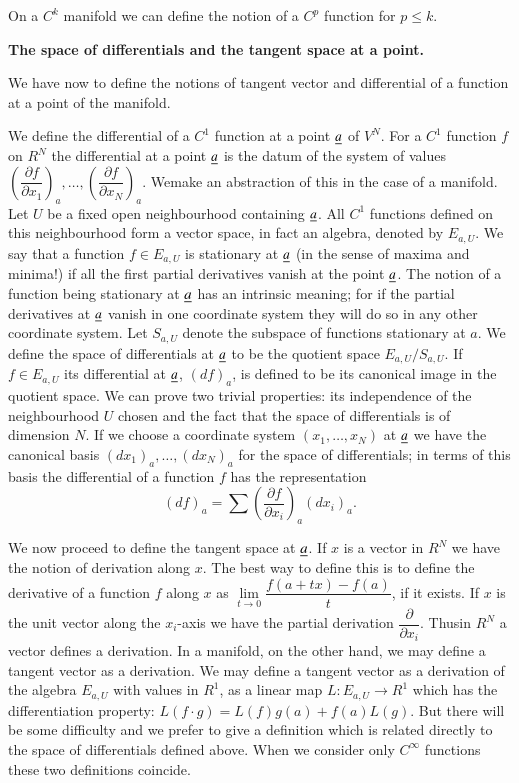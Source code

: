 On a $C^{k}$ manifold we can define the notion of a $C^{p}$ function
for $p\leq k$.

\noindent
{\bf The space of differentials and the tangent space at a point.}

We have now to define the notions of tangent vector and differential
of a function at a point of the manifold.

We define the differential of a $C^{1}$ function at a point $\underline{a}$
of $V^{N}$. For a $C^{1}$ function $f$ on $R^{N}$ the differential at
a point $\underline{a}$ is the datum of the system of values
$\left(\dfrac{\partial f}{\partial
  x_{1}}\right)_{a},\ldots,\left(\dfrac{\partial f}{\partial
  x_{N}}\right)_{a}$. We\pageoriginale make an abstraction of this in
the case of a manifold. Let $U$ be a fixed open neighbourhood
containing $\underline{a}$. All $C^{1}$ functions defined on this
neighbourhood form a vector space, in fact an algebra, denoted by
$E_{a,U}$. We say that a function $f\in E_{a,U}$ is stationary at
$\underline{a}$ (in the sense of maxima and minima!) if all the first partial
derivatives vanish at the point $\underline{a}$. The notion of a function
being stationary at $\underline{a}$ has an intrinsic meaning; for if the
partial derivatives at $\underline{a}$ vanish in one coordinate system they
will do so in any other coordinate system. Let $S_{a,U}$ denote the
subspace of functions stationary at $a$. We define the space of
differentials at $\underline{a}$ to be the quotient space
$E_{a,U}/S_{a,U}$. If $f\in E_{a,U}$ its differential at $\underline{a}$,
$(df)_{a}$, is defined to be its canonical image in the quotient
space. We can prove two trivial properties: its independence of the
neighbourhood $U$ chosen and the fact that the space of differentials
is of dimension $N$. If we choose a coordinate system
$(x_{1},\ldots,x_{N})$ at $\underline{a}$ we have the canonical basis
$(dx_{1})_{a},\ldots,(dx_{N})_{a}$ for the space of differentials; in
terms of this basis the differential of a function $f$ has the
representation
$$
(df)_{a}=\sum\left(\frac{\partial f}{\partial
  x_{i}}\right)_{a}(dx_{i})_{a}.
$$

We now proceed to define the tangent space at $\underline{a}$. If $x$ is a
vector in $R^{N}$ we have the notion of derivation along $x$. The best
way to define this is to define the derivative of a function $f$ along
$x$ as $\lim\limits_{t\to 0}\dfrac{f(a+tx)-f(a)}{t}$, if it exists. If
$x$ is the unit vector along the $x_{i}$-axis we have the partial
derivation $\dfrac{\partial}{\partial x_{i}}$. 
Thus\pageoriginale in $R^{N}$ a vector defines a derivation. In a
manifold, on the other hand, we may define a tangent vector as a
derivation. We may define a tangent vector as a derivation of the
algebra $E_{a,U}$ with values in $R^{1}$, \iec as a linear map
$L:E_{a,U}\to R^{1}$ which has the differentiation property: $L(f\cdot
g)=L(f)g(a)+f(a)L(g)$. But there will be some difficulty and we prefer
to give a definition which is related directly to the space of
differentials defined above. When we consider only $C^{\infty}$
functions these two definitions coincide.

